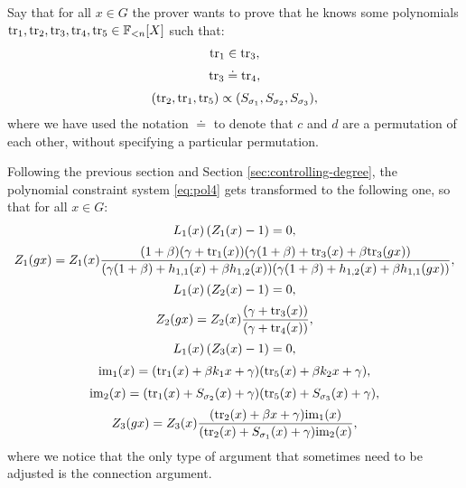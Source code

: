 \begin{example}\label{sec:concrete-example}
Say that for all $x \in G$ the prover wants to prove that he knows some polynomials $\text{tr}_1,\text{tr}_2,\text{tr}_3,\text{tr}_4,\text{tr}_5 \in \mathbb{F}_{<n}[X]$ such that:
\begin{align}\label{eq:pol4}
\begin{array}{c}
\text{tr}_1 \in \text{tr}_3, \\[0.2cm]
\text{tr}_3 \doteq \text{tr}_4, \\[0.2cm]
(\text{tr}_2,\text{tr}_1,\text{tr}_5) \propto (S_{\sigma_1},S_{\sigma_2},S_{\sigma_3}),
\end{array}
\end{align}
where we have used the notation $\doteq$ to denote that $c$ and $d$ are a permutation of each other, without specifying a particular permutation.

Following the previous section and Section \ref{sec:controlling-degree}, the polynomial constraint system \eqref{eq:pol4} gets transformed to the following one, so that for all $x \in G$:
\begin{align*}
\begin{array}{c}
  L_1(x) \left( Z_1(x) - 1\right) = 0, \\[0.2cm]
Z_1(gx) = \displaystyle Z_1(x)\frac{(1+\beta)(\gamma + \text{tr}_1(x))(\gamma(1+\beta) + \text{tr}_3(x) + \beta \text{tr}_3(gx))}{(\gamma(1+\beta) + {h_{1,1}}(x) + \beta {h_{1,2}}(x))(\gamma(1+\beta) + {h_{1,2}}(x) + \beta {h_{1,1}}(gx))}, \\[0.4cm]
L_1(x) \left( Z_2(x) - 1\right) = 0, \\[0.2cm]
Z_2(g x) = \displaystyle Z_2(x)\frac{(\gamma + \text{tr}_3(x))}{(\gamma + \text{tr}_4(x))}, \\[0.4cm]
L_1(x) \left( Z_3(x) - 1\right) = 0, \\[0.2cm]
\text{im}_1(x) = (\text{tr}_1(x) + \beta k_1x + \gamma)(\text{tr}_5(x) + \beta k_2x + \gamma), \\[0.2cm]
\text{im}_2(x) = (\text{tr}_1(x) + S_{\sigma_2}(x) + \gamma)(\text{tr}_5(x) + S_{\sigma_3}(x) + \gamma), \\[0.2cm]
Z_3(g x) = \displaystyle Z_3(x)\frac{(\text{tr}_2(x) + \beta x + \gamma) \text{im}_1(x)}{(\text{tr}_2(x) + S_{\sigma_1}(x) + \gamma)\text{im}_2(x)},
\end{array}
\end{align*}
where we notice that the only type of argument that sometimes need to be adjusted is the connection argument.
\end{example}


